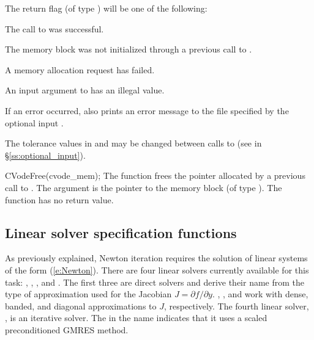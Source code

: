 {
  The return flag  (of type ) will be one of the following:
  \begin{args}
  \item[\Id{CV\_SUCCESS}]
    The call to  was successful.
  \item[\Id{CV\_MEM\_NULL}] 
    The {\cvode} memory block was not initialized through a previous call
    to .
  \item[\Id{CV\_MEM\_FAIL}] 
    A memory allocation request has failed.
  \item[\Id{CV\_ILL\_INPUT}] 
    An input argument to  has an illegal value.
  \end{args}
}
{
  If an error occurred,  also prints an error message to the
  file specified by the optional input .

  The tolerance values in  and  may be changed between
  calls to  (see  in \S\ref{ss:optional_input}).
}
{
  CVodeFree(cvode\_mem);
}
{
  The function  frees the pointer allocated by
  a previous call to .
}
{
  The argument is the pointer to the {\cvode} memory block (of type ).
}
{
  The function  has no return value.
}
{}
\subsection{Linear solver specification functions}\label{sss:lin_solv_init}

As previously explained, Newton iteration requires the solution of
linear systems of the form (\ref{e:Newton}).  There are four {\cvode} linear
solvers currently available for this task: {\cvdense}, {\cvband}, {\cvdiag},
and {\cvspgmr}.  The first three are direct solvers and derive their name
from the type of approximation used for the Jacobian 
$J = \partial{f}/\partial{y}$.  {\cvdense}, {\cvband}, and {\cvdiag} work with
dense, banded, and diagonal approximations to $J$, respectively.  The
fourth {\cvode} linear solver, {\cvspgmr}, is an iterative solver.  The {\spgmr}
in the name indicates that it uses a scaled preconditioned
GMRES method.

